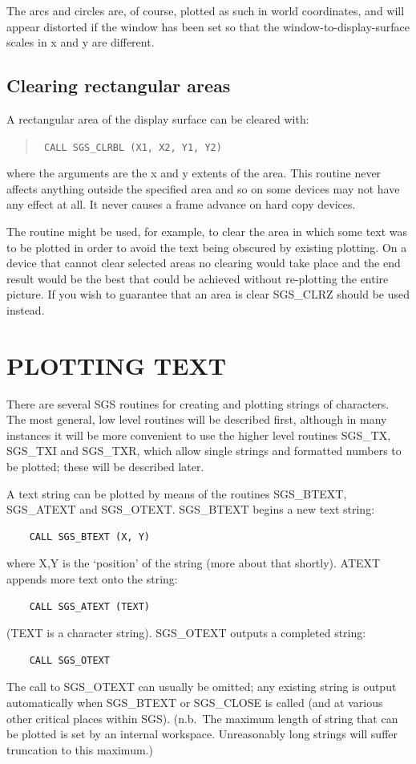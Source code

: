 \documentclass[11pt]{article}
\newcommand{\htmlref}[2]{#1}
\begin{document}
The arcs and circles are, of course, plotted as such in
world coordinates, and will appear
distorted if the window has been set so that the
window-to-display-surface scales in
x and y are different.

\subsection {Clearing rectangular areas}\label{sec-clr-rect}
A rectangular area of the display surface can be cleared with:
\begin{quote}{\tt
    CALL \htmlref{SGS\_CLRBL}{SGS_CLRBL} (X1, X2, Y1, Y2)}
\end{quote}
where the arguments are the x and y extents of the area.  This routine never
affects anything outside the specified area and so on some devices may not
have any effect at all.  It never causes a frame advance on hard copy devices.

The routine might be used, for example, to clear the area in which some text
was to be plotted in order to avoid the text being obscured by existing
plotting.  On a device that cannot clear selected areas no clearing would
take place and the end result would be the best that could be achieved without
re-plotting the entire picture.
If you wish to guarantee that an area is clear 
\htmlref{SGS\_CLRZ}{SGS_CLRZ} should be used instead.

\section {PLOTTING TEXT}

There are several SGS routines for creating and plotting
strings of characters.  The most general, low level routines
will be described first, although in many instances it will be
more convenient to use the higher level routines 
\htmlref{SGS\_TX}{SGS_TX}, 
\htmlref{SGS\_TXI}{SGS_TXI} and
\htmlref{SGS\_TXR}{SGS_TXR}, 
which allow single strings and formatted numbers to be
plotted;  these will be described later.

A text string can be plotted by means of the
routines 
\htmlref{SGS\_BTEXT}{SGS_BTEXT}, 
\htmlref{SGS\_ATEXT}{SGS_ATEXT} and 
\htmlref{SGS\_OTEXT}{SGS_OTEXT}.  SGS\_BTEXT begins a new 
text string:
\begin{verbatim}
    CALL SGS_BTEXT (X, Y)
\end{verbatim}
where X,Y is the `position' of the string (more about that
shortly).  ATEXT appends more text onto the string:
\begin{verbatim}
    CALL SGS_ATEXT (TEXT)
\end{verbatim}
(TEXT is a character string).  SGS\_OTEXT outputs a completed string:
\begin{verbatim}
    CALL SGS_OTEXT
\end{verbatim}
The call to SGS\_OTEXT can usually be omitted;  any existing string
is output automatically when SGS\_BTEXT or 
\htmlref{SGS\_CLOSE}{SGS_CLOSE} is called (and
at various other critical places within SGS).
(n.b.\ The maximum length of string that can be plotted is set by
an internal workspace.  Unreasonably long strings will suffer
truncation to this maximum.)
\end{document}
